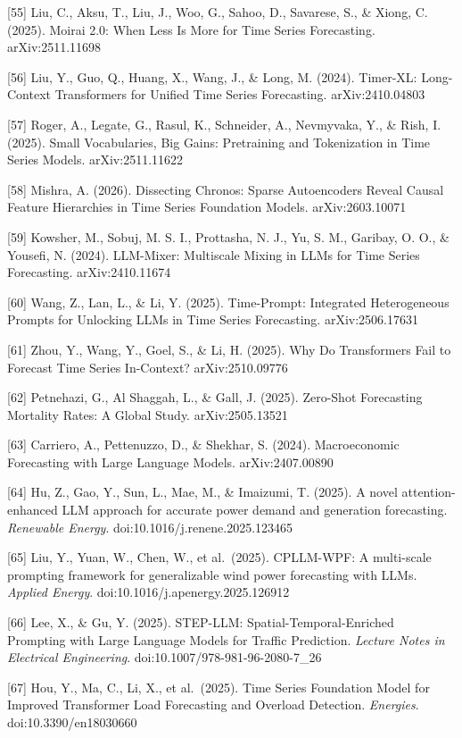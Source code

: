 {[}55{]} Liu, C., Aksu, T., Liu, J., Woo, G., Sahoo, D., Savarese, S., \& Xiong, C. (2025). Moirai 2.0: When Less Is More for Time Series Forecasting. arXiv:2511.11698

{[}56{]} Liu, Y., Guo, Q., Huang, X., Wang, J., \& Long, M. (2024). Timer-XL: Long-Context Transformers for Unified Time Series Forecasting. arXiv:2410.04803

{[}57{]} Roger, A., Legate, G., Rasul, K., Schneider, A., Nevmyvaka, Y., \& Rish, I. (2025). Small Vocabularies, Big Gains: Pretraining and Tokenization in Time Series Models. arXiv:2511.11622

{[}58{]} Mishra, A. (2026). Dissecting Chronos: Sparse Autoencoders Reveal Causal Feature Hierarchies in Time Series Foundation Models. arXiv:2603.10071

{[}59{]} Kowsher, M., Sobuj, M. S. I., Prottasha, N. J., Yu, S. M., Garibay, O. O., \& Yousefi, N. (2024). LLM-Mixer: Multiscale Mixing in LLMs for Time Series Forecasting. arXiv:2410.11674

{[}60{]} Wang, Z., Lan, L., \& Li, Y. (2025). Time-Prompt: Integrated Heterogeneous Prompts for Unlocking LLMs in Time Series Forecasting. arXiv:2506.17631

{[}61{]} Zhou, Y., Wang, Y., Goel, S., \& Li, H. (2025). Why Do Transformers Fail to Forecast Time Series In-Context? arXiv:2510.09776

{[}62{]} Petnehazi, G., Al Shaggah, L., \& Gall, J. (2025). Zero-Shot Forecasting Mortality Rates: A Global Study. arXiv:2505.13521

{[}63{]} Carriero, A., Pettenuzzo, D., \& Shekhar, S. (2024). Macroeconomic Forecasting with Large Language Models. arXiv:2407.00890

{[}64{]} Hu, Z., Gao, Y., Sun, L., Mae, M., \& Imaizumi, T. (2025). A novel attention-enhanced LLM approach for accurate power demand and generation forecasting. \emph{Renewable Energy}. doi:10.1016/j.renene.2025.123465

{[}65{]} Liu, Y., Yuan, W., Chen, W., et al.~(2025). CPLLM-WPF: A multi-scale prompting framework for generalizable wind power forecasting with LLMs. \emph{Applied Energy}. doi:10.1016/j.apenergy.2025.126912

{[}66{]} Lee, X., \& Gu, Y. (2025). STEP-LLM: Spatial-Temporal-Enriched Prompting with Large Language Models for Traffic Prediction. \emph{Lecture Notes in Electrical Engineering}. doi:10.1007/978-981-96-2080-7\_26

{[}67{]} Hou, Y., Ma, C., Li, X., et al.~(2025). Time Series Foundation Model for Improved Transformer Load Forecasting and Overload Detection. \emph{Energies}. doi:10.3390/en18030660


